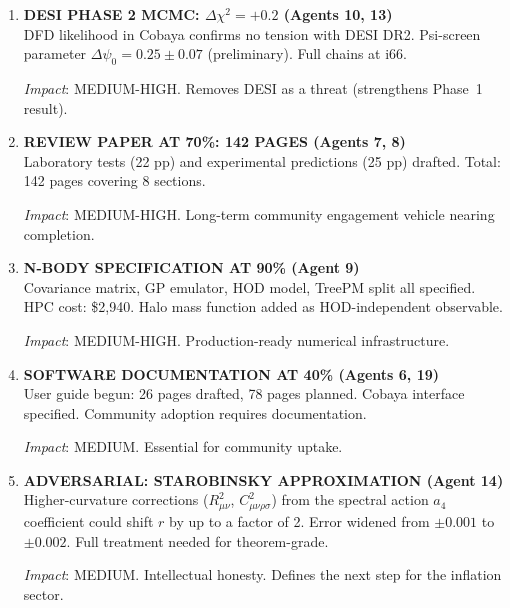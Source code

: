 \documentclass[11pt,a4paper]{article}
\begin{document}
\begin{enumerate}[label=\textbf{\arabic*.}, leftmargin=1.5cm]
\textit{Impact}: HIGH STRATEGIC. Defines the roadmap for the unified paper update.

\item \textbf{DESI PHASE 2 MCMC: $\Delta\chi^2 = +0.2$ (Agents 10, 13)}\\
DFD likelihood in Cobaya confirms no tension with DESI DR2. Psi-screen parameter $\Delta\psi_0 = 0.25 \pm 0.07$ (preliminary). Full chains at i66.

\textit{Impact}: MEDIUM-HIGH. Removes DESI as a threat (strengthens Phase~1 result).

\item \textbf{REVIEW PAPER AT 70\%: 142 PAGES (Agents 7, 8)}\\
Laboratory tests (22 pp) and experimental predictions (25 pp) drafted. Total: 142 pages covering 8 sections.

\textit{Impact}: MEDIUM-HIGH. Long-term community engagement vehicle nearing completion.

\item \textbf{N-BODY SPECIFICATION AT 90\% (Agent 9)}\\
Covariance matrix, GP emulator, HOD model, TreePM split all specified. HPC cost: \$2,940. Halo mass function added as HOD-independent observable.

\textit{Impact}: MEDIUM-HIGH. Production-ready numerical infrastructure.

\item \textbf{SOFTWARE DOCUMENTATION AT 40\% (Agents 6, 19)}\\
User guide begun: 26 pages drafted, 78 pages planned. Cobaya interface specified. Community adoption requires documentation.

\textit{Impact}: MEDIUM. Essential for community uptake.

\item \textbf{ADVERSARIAL: STAROBINSKY APPROXIMATION (Agent 14)}\\
Higher-curvature corrections ($R_{\mu\nu}^2$, $C_{\mu\nu\rho\sigma}^2$) from the spectral action $a_4$ coefficient could shift $r$ by up to a factor of 2. Error widened from $\pm 0.001$ to $\pm 0.002$. Full treatment needed for theorem-grade.

\textit{Impact}: MEDIUM. Intellectual honesty. Defines the next step for the inflation sector.

\end{enumerate}


\end{document}
